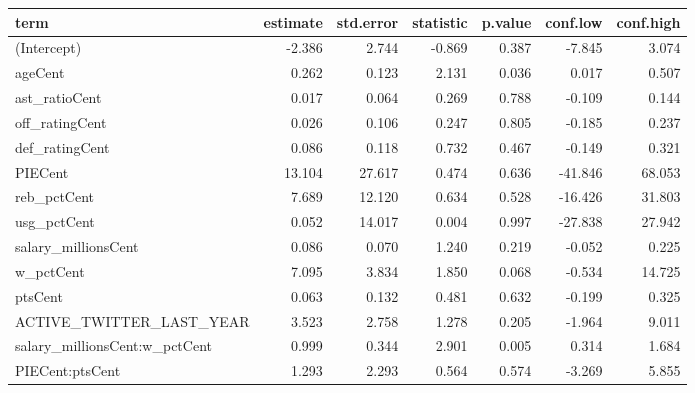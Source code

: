 \documentclass[]{article}
\newenvironment{Shaded}{\begin{snugshade}}{\end{snugshade}}
\newcommand{\DataTypeTok}[1]{\textcolor[rgb]{0.13,0.29,0.53}{#1}}
\newcommand{\DecValTok}[1]{\textcolor[rgb]{0.00,0.00,0.81}{#1}}
\newcommand{\KeywordTok}[1]{\textcolor[rgb]{0.13,0.29,0.53}{\textbf{#1}}}
\newcommand{\NormalTok}[1]{#1}
\newcommand{\OperatorTok}[1]{\textcolor[rgb]{0.81,0.36,0.00}{\textbf{#1}}}
\newcommand{\OtherTok}[1]{\textcolor[rgb]{0.56,0.35,0.01}{#1}}
\newcommand{\StringTok}[1]{\textcolor[rgb]{0.31,0.60,0.02}{#1}}
\begin{document}
\begin{Shaded}
\end{Shaded}

\begin{longtable}[]{@{}lrrrrrr@{}}
\toprule
term & estimate & std.error & statistic & p.value & conf.low &
conf.high\tabularnewline
\midrule
\endhead
(Intercept) & -2.386 & 2.744 & -0.869 & 0.387 & -7.845 &
3.074\tabularnewline
ageCent & 0.262 & 0.123 & 2.131 & 0.036 & 0.017 & 0.507\tabularnewline
ast\_ratioCent & 0.017 & 0.064 & 0.269 & 0.788 & -0.109 &
0.144\tabularnewline
off\_ratingCent & 0.026 & 0.106 & 0.247 & 0.805 & -0.185 &
0.237\tabularnewline
def\_ratingCent & 0.086 & 0.118 & 0.732 & 0.467 & -0.149 &
0.321\tabularnewline
PIECent & 13.104 & 27.617 & 0.474 & 0.636 & -41.846 &
68.053\tabularnewline
reb\_pctCent & 7.689 & 12.120 & 0.634 & 0.528 & -16.426 &
31.803\tabularnewline
usg\_pctCent & 0.052 & 14.017 & 0.004 & 0.997 & -27.838 &
27.942\tabularnewline
salary\_millionsCent & 0.086 & 0.070 & 1.240 & 0.219 & -0.052 &
0.225\tabularnewline
w\_pctCent & 7.095 & 3.834 & 1.850 & 0.068 & -0.534 &
14.725\tabularnewline
ptsCent & 0.063 & 0.132 & 0.481 & 0.632 & -0.199 & 0.325\tabularnewline
ACTIVE\_TWITTER\_LAST\_YEAR & 3.523 & 2.758 & 1.278 & 0.205 & -1.964 &
9.011\tabularnewline
salary\_millionsCent:w\_pctCent & 0.999 & 0.344 & 2.901 & 0.005 & 0.314
& 1.684\tabularnewline
PIECent:ptsCent & 1.293 & 2.293 & 0.564 & 0.574 & -3.269 &
5.855\tabularnewline
\bottomrule
\end{longtable}
\end{document}
